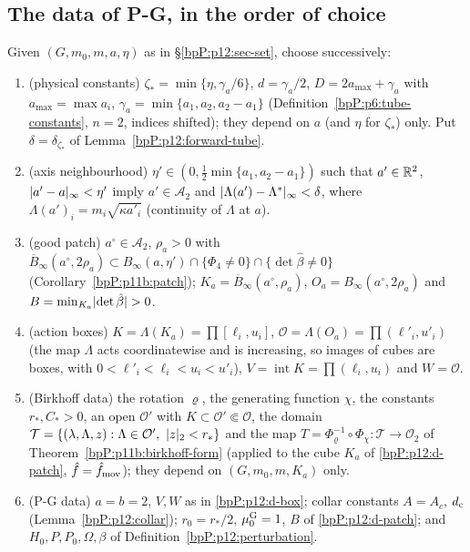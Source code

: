 \subsection{The data of P-G, in the order of choice}\label{bpP:p12:sec-data}

\begin{definition}\label{bpP:p12:data}
Given $(G,m_0,m,a,\eta)$ as in \S\ref{bpP:p12:sec-set}, choose successively:
\begin{enumerate}[label=(D\arabic*)]
\item\label{bpP:p12:d-tube} (physical constants) $\zeta_*=\min\{\eta,\gamma_a/6\}$, $d=\gamma_a/2$, $D=2a_{\max}+\gamma_a$ with $a_{\max}=\max a_i$, $\gamma_a=\min\{a_1,a_2,a_2-a_1\}$ (Definition~\ref{bpP:p6:tube-constants}, $n=2$, indices shifted); they depend on $a$ (and $\eta$ for $\zeta_*$) only. Put $\delta=\delta_{\zeta_*}$ of Lemma~\ref{bpP:p12:forward-tube}.
\item\label{bpP:p12:d-eta} (axis neighbourhood) $\eta'\in(0,\tfrac12\min\{a_1,a_2-a_1\})$ such that $a'\in\mathbb{R}^2$, $\lvert a'-a\rvert_\infty<\eta'$ imply $a'\in\mathcal A_2$ and $\lvert \Lambda(a')-\Lambda^*\rvert_\infty<\delta$, where $\Lambda(a')_i=m_i\sqrt{\kappa a'_i}$ (continuity of $\Lambda$ at $a$).
\item\label{bpP:p12:d-patch} (good patch) $a^\circ\in\mathcal A_2$, $\rho_a>0$ with $\overline B_\infty(a^\circ,2\rho_a)\subset B_\infty(a,\eta')\cap\{\Phi_4\ne0\}\cap\{\det\hat\beta\ne0\}$ (Corollary~\ref{bpP:p11b:patch}); $K_a=\overline B_\infty(a^\circ,\rho_a)$, $O_a=B_\infty(a^\circ,2\rho_a)$ and $B=\min_{K_a}\lvert \det\hat\beta\rvert>0$.
\item\label{bpP:p12:d-box} (action boxes) $K=\Lambda(K_a)=\prod[\ell_i,u_i]$, $\mathcal O=\Lambda(O_a)=\prod(\ell'_i,u'_i)$ (the map $\Lambda$ acts coordinatewise and is increasing, so images of cubes are boxes, with $0<\ell'_i<\ell_i<u_i<u'_i$), $V=\operatorname{int}K=\prod(\ell_i,u_i)$ and $W=\mathcal O$.
\item\label{bpP:p12:d-bnf} (Birkhoff data) the rotation $\varrho$, the generating function $\chi$, the constants $r_*,C_*>0$, an open $\mathcal O'$ with $K\subset\mathcal O'\Subset\mathcal O$, the domain $\mathcal T=\{(\lambda,\Lambda,z):\Lambda\in\mathcal O',\ \lvert z\rvert_2<r_*\}$ and the map $T=\Phi_\varrho^{-1}\circ\Phi_\chi:\mathcal T\to\mathcal O_2$ of Theorem~\ref{bpP:p11b:birkhoff-form} (applied to the cube $K_a$ of \ref{bpP:p12:d-patch}, $\hat f=\hat f_{\rm mov}$); they depend on $(G,m_0,m,K_a)$ only.
\item\label{bpP:p12:d-pg} (P-G data) $a=b=2$, $V,W$ as in \ref{bpP:p12:d-box}; collar constants $A=A_c$, $d_{\rm c}$ (Lemma~\ref{bpP:p12:collar}); $r_0=r_*/2$, $\mu_0^{\rm G}=1$, $B$ of \ref{bpP:p12:d-patch}; and $H_0,P,P_0,\Omega,\beta$ of Definition~\ref{bpP:p12:perturbation}.

\end{enumerate}
\end{definition}
